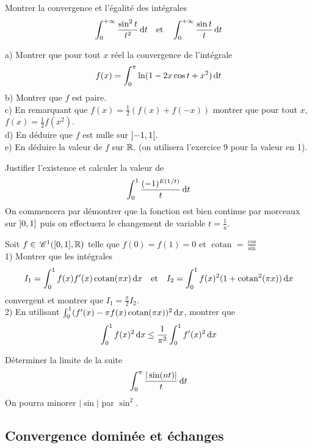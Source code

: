 \begin{exercice}
Montrer la convergence et l'égalité des intégrales
$$ \int_{0}^{+\infty}\frac{\sin^{2}t}{t^{2}}\,\mathrm{d}t \quad \text{et} \quad \int_{0}^{+\infty}\frac{\sin t}{t}\,\mathrm{d}t $$
\end{exercice}

\begin{exercice}
a) Montrer que pour tout $x$ réel la convergence de l'intégrale
$$ f(x)=\int_{0}^{\pi}\ln(1-2x \cos t+x^{2})\,\mathrm{d}t $$
b) Montrer que $f$ est paire. \\
c) En remarquant que $f(x)=\frac{1}{2}(f(x)+f(-x))$ montrer que pour tout $x$, $f(x)=\frac{1}{2}f(x^{2})$. \\
d) En déduire que $f$ est nulle sur $\left]-1, 1\right[$. \\
e) En déduire la valeur de $f$ sur $\mathbb{R}$. (on utilisera l'exercice 9 pour la valeur en 1).
\end{exercice}

\begin{exercice}
Justifier l'existence et calculer la valeur de
$$ \int_{0}^{1}\frac{(-1)^{E(1/t)}}{t}\,\mathrm{d}t $$
On commencera par démontrer que la fonction est bien continue par morceaux sur $\left]0, 1\right]$ puis on effectuera le changement de variable $t=\frac{1}{u}$.
\end{exercice}

\begin{exercice}
Soit $f\in \,\mathscr C^{1}([0,1],\mathbb{R})$ telle que $f(0)=f(1)=0$ et $\operatorname{cotan}=\frac{\cos}{\sin}$ \\
1) Montrer que les intégrales
$$ I_{1}=\int_{0}^{1}f(x)f^{\prime}(x)\operatorname{cotan}(\pi x)\,\mathrm{d}x \quad \text{et} \quad I_{2}=\int_{0}^{1}f(x)^{2}(1+\operatorname{cotan}^{2}(\pi x))\,\mathrm{d}x $$
convergent et montrer que $I_{1}=\frac{\pi}{2}I_{2}$. \\
2) En utilisant $\int_{0}^{1}(f^{\prime}(x)-\pi f(x)\operatorname{cotan}(\pi x))^{2}\,\mathrm{d}x$, montrer que
$$ \int_{0}^{1}f(x)^{2}\,\mathrm{d}x \le \frac{1}{\pi^{2}}\int_{0}^{1}f^{\prime}(x)^{2}\,\mathrm{d}x $$
\end{exercice}

\begin{exercice}
Déterminer la limite de la suite
$$ \int_{0}^{\pi}\frac{|\sin(nt)|}{t}\,\mathrm{d}t $$
On pourra minorer $|\sin|$ par $\sin^{2}$.
\end{exercice}

\subsection{Convergence dominée et échanges}

